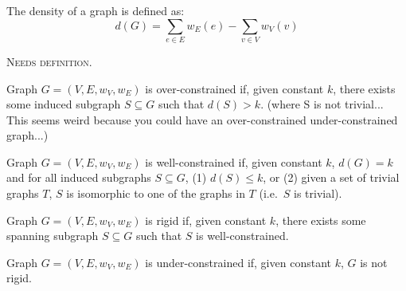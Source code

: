 \documentclass[11pt]{article}
\newcommand{\todo}[1]{\textsc{{\color{red}#1}}}
\begin{document}
\begin{definition}[Density]
The density of a graph is defined as:
\[d(G) = \sum_{e\in E}{w_E(e)} - \sum_{v\in V}{w_V(v)}\]
\end{definition}

\begin{definition}
\todo{Needs definition.}
\end{definition}

\begin{definition}
Graph $G=(V,E,w_V,w_E)$ is over-constrained if, given constant $k$, there exists some induced subgraph $S\subseteq G$ such that $d(S) > k$. (where S is not trivial... This seems weird because you could have an over-constrained under-constrained graph...)
\end{definition}

\begin{definition}
Graph $G=(V,E,w_V,w_E)$ is well-constrained if, given constant $k$, $d(G) = k$ and for all induced subgraphs $S\subseteq G$, (1) $d(S)\leq k$, or (2) given a set of trivial graphs $T$, $S$ is isomorphic to one of the graphs in $T$ (i.e.\ $S$ is trivial).
\end{definition}


\begin{definition}
Graph $G=(V,E,w_V,w_E)$ is rigid if, given constant $k$, there exists some spanning subgraph $S\subseteq G$ such that $S$ is well-constrained.
\end{definition}

\begin{definition}
Graph $G=(V,E,w_V,w_E)$ is under-constrained if, given constant $k$, $G$ is not rigid.
\end{definition}

\end{document}
